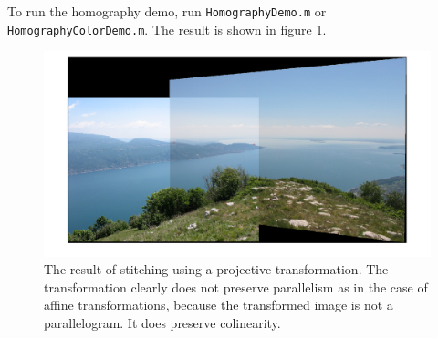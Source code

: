 \documentclass[a4paper,10pt]{article}
\begin{document}
To run the homography demo, run \verb+HomographyDemo.m+ or \verb+HomographyColorDemo.m+.
The result is shown in figure \ref{fig:stitchedhomo}.

\begin{figure}
\includegraphics[width=1\textwidth]{img/homographycolorstitch2}
\caption{The result of stitching using a projective transformation. The transformation clearly does not preserve parallelism as in the case of affine transformations, because the transformed image is not a parallelogram. It does preserve colinearity.}
\label{fig:stitchedhomo}
\end{figure}
\end{document}

